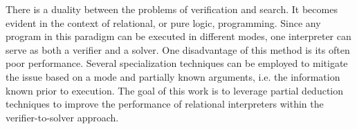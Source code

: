 There is a duality between the problems of verification and search. 
It becomes evident in the context of relational, or pure logic, programming. 
Since any program in this paradigm can be executed in different modes, one interpreter can serve as both a verifier and a solver. 
One disadvantage of this method is its often poor performance. 
Several specialization techniques can be employed to mitigate the issue based on a mode and partially known arguments, i.e. the information known prior to execution. 
The goal of this work is to leverage partial deduction techniques to improve the performance of relational interpreters within the verifier-to-solver approach.